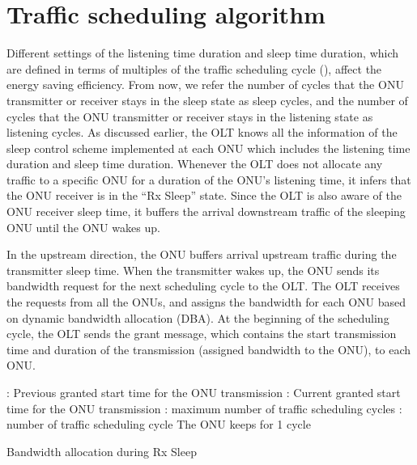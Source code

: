 \documentclass[11pt,english,12pt,onecolumn, draftcls]{IEEEtran}
\theoremstyle{plain}
\theoremstyle{definition}
\begin{document}
\section{Traffic scheduling algorithm}
\label{sec:Schedul}
Different settings of the listening time duration and sleep time duration, which are defined in terms of multiples of the traffic scheduling cycle (), affect the energy saving efficiency. From now, we refer the number of cycles that the ONU transmitter or receiver stays in the sleep state as sleep cycles, and the number of cycles that the ONU transmitter or receiver stays in the listening state as listening cycles. As discussed earlier, the OLT knows all the information of the sleep control scheme implemented at each ONU which includes the listening time duration and sleep time duration. Whenever the OLT does not allocate any traffic to a specific ONU for a duration of the ONU's listening time, it infers that the ONU receiver is in the ``Rx Sleep'' state. Since the OLT is also aware of the ONU receiver sleep time, it buffers the arrival downstream traffic of the sleeping ONU until the ONU wakes up.

In the upstream direction, the ONU buffers arrival upstream traffic during the transmitter sleep time. When the transmitter wakes up, the ONU sends its bandwidth request for the next scheduling cycle to the OLT. The OLT receives the requests from all the ONUs, and assigns the bandwidth for each ONU based on dynamic bandwidth allocation (DBA). At the beginning of the scheduling cycle, the OLT sends the grant message, which contains the start transmission time and duration of the transmission (assigned bandwidth to the ONU), to each ONU.

\begin{algorithm}

: Previous granted start time for the ONU transmission\;
 : Current granted start time for the ONU transmission\;
 : maximum number of traffic scheduling cycles\;
 : number of traffic scheduling cycle\;
 \;
 The ONU keeps  for 1 cycle\;
 \caption{Bandwidth allocation during Rx Sleep}

 \label{alg:BW}
\end{algorithm}
\end{document}
